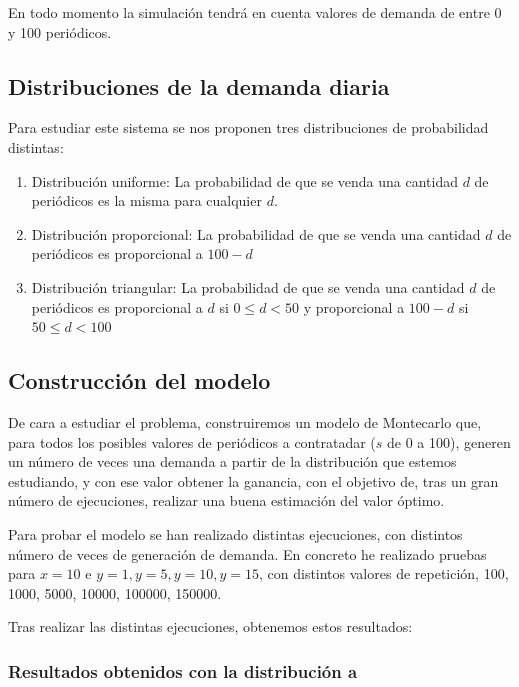 \documentclass[12pt, spanish]{article}
\begin{document}
En todo momento la simulación tendrá en cuenta valores de demanda de entre 0 y 100 periódicos.

\subsection{Distribuciones de la demanda diaria}

Para estudiar este sistema se nos proponen tres distribuciones de probabilidad distintas:

\begin{enumerate}[label=\alph*]
	\item Distribución uniforme: La probabilidad de que se venda una cantidad $d$ de periódicos es la misma para cualquier $d$.
	\item Distribución proporcional: La probabilidad de que se venda una cantidad $d$ de periódicos es proporcional a $100 - d$
	\item Distribución triangular: La probabilidad de que se venda una cantidad $d$ de periódicos es proporcional a $d$ si $0 \leq d < 50$ y proporcional a $100 - d$ si $50 \leq d < 100$

\end{enumerate}



\subsection{Construcción del modelo}

De cara a estudiar el problema, construiremos un modelo de Montecarlo que, para todos los posibles valores de periódicos a contratadar ($s$ de 0 a 100), generen un número de veces una demanda a partir de la distribución que estemos estudiando, y con ese valor obtener la ganancia, con el objetivo de, tras un gran número de ejecuciones, realizar una buena estimación del valor óptimo.


Para probar el modelo se han realizado distintas ejecuciones, con distintos número de veces de generación de demanda. En concreto he realizado pruebas para $x = 10$ e $y = 1, y = 5, y = 10, y = 15$, con distintos valores de repetición, 100, 1000, 5000, 10000, 100000, 150000.

Tras realizar las distintas ejecuciones, obtenemos estos resultados:


\subsubsection{Resultados obtenidos con la distribución a}
\end{document}
